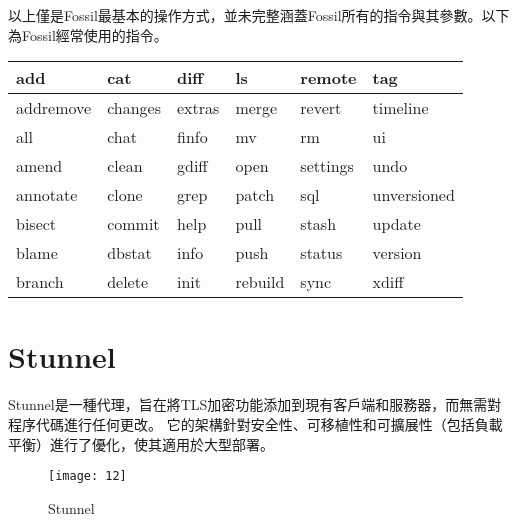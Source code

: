 \renewcommand{\baselinestretch}{1} %
\twelve \hspace{0.5em} 以上僅是Fossil最基本的操作方式，並未完整涵蓋Fossil所有的指令與其參數。以下為Fossil經常使用的指令。
\\
\par
\begin{center}
\begin{tabular}{|p{2cm}|p{2cm}|p{2cm}|p{2cm}|p{2cm}|p{2cm}|} %
\hline
add          &cat          &diff         &ls           &remote       &tag
\\
\hline
addremove    &changes      &extras       &merge        &revert       &timeline
\\
\hline
all          &chat         &finfo        &mv           &rm           &ui
\\
\hline
amend        &clean        &gdiff        &open         &settings     &undo
\\
\hline
annotate     &clone        &grep         &patch        &sql          &unversioned
\\
\hline
bisect       &commit       &help         &pull         &stash        &update
\\
\hline
blame        &dbstat       &info         &push         &status       &version
\\
\hline
branch       &delete       &init         &rebuild      &sync         &xdiff
\\
\hline
\end{tabular}
\end{center}

\clearpage %
\renewcommand{\baselinestretch}{20} %
\section{Stunnel}
\par
\renewcommand{\baselinestretch}{1} %
\twelve \qquad Stunnel是一種代理，旨在將TLS加密功能添加到現有客戶端和服務器，而無需對程序代碼進行任何更改。 它的架構針對安全性、可移植性和可擴展性（包括負載平衡）進行了優化，使其適用於大型部署。
\\
\par
\renewcommand{\baselinestretch}{1.7} %
\begin{figure}[hbt!]
\begin{center}
\texttt{[image: 12]}
\caption{\large Stunnel}\label{fig.Stunnel}
\end{center}
\end{figure}
\par

